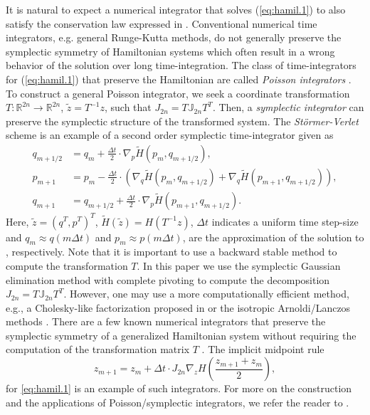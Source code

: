 It is natural to expect a numerical integrator that solves (\ref{eq:hamil.1}) to also satisfy the conservation law expressed in  . Conventional numerical time integrators, e.g. general Runge-Kutta methods, do not generally preserve the symplectic symmetry of Hamiltonian systems which often result in a wrong behavior of the solution over long time-integration. The class of time-integrators for (\ref{eq:hamil.1}) that preserve the Hamiltonian are called \emph{Poisson integrators} \cite{Hairer:1250576}. To construct a general Poisson integrator, we seek a coordinate transformation $T:\mathbb R^{2n}\to\mathbb R^{2n}$, $\tilde z = T^{-1}z$, such that $J_{2n} = T \mathbb J_{2n} T^T$. Then, a \emph{symplectic integrator} can preserve the symplectic structure of the transformed system. The \emph{St\"ormer-Verlet} scheme is an example of a second order symplectic time-integrator given as
\begin{equation} \label{eq:hamil.6}
	\begin{aligned}
	q_{m+1/2} &= q_m + \frac{\Delta t} 2 \cdot \nabla_p \tilde H(p_m,q_{m+1/2}), \\
	p_{m+1} &= p_m - \frac{\Delta t} 2  \cdot \left( \nabla_q \tilde H(p_m,q_{m+1/2}) + \nabla_{q} \tilde H(p_{m+1},q_{m+1/2}) \right), \\
	q_{m+1} &= q_{m+1/2} + \frac{\Delta t} 2  \cdot  \nabla_p \tilde H(p_{m+1},q_{m+1/2}).
	\end{aligned}
\end{equation}
Here, $\tilde z = (q^T,p^T)^T$, $\tilde H(\tilde z) = H(T^{-1}z)$, $\Delta t$ indicates a uniform time step-size and $q_m \approx q(m\Delta t)$ and $p_m \approx p(m\Delta t)$, are the approximation of the solution to , respectively. Note that it is important to use a backward stable method to compute the transformation $T$. In this paper we use the symplectic Gaussian elimination method with complete pivoting to compute the decomposition $J_{2n} = T \mathbb J_{2n} T^T$. However, one may use a more computationally efficient method, e.g., a Cholesky-like factorization proposed in \cite{benner:chol} or the isotropic Arnoldi/Lanczos methods \cite{doi:10.1137/S1064827500366434}. There are a few known numerical integrators that preserve the symplectic symmetry of a generalized Hamiltonian system without requiring the computation of the transformation matrix $T$ \cite{Hairer:1250576}. The implicit midpoint rule
\begin{equation} \label{eq:hamil.7}
	z_{m+1} = z_{m} + \Delta t \cdot J_{2n} \nabla_z H \left( \frac{z_{m+1} + z_m}{2} \right),
\end{equation}
for \cref{eq:hamil.1} is an example of such integrators. For more on the construction and the applications of Poisson/symplectic integrators, we refer the reader to \cite{Hairer:1250576}.
